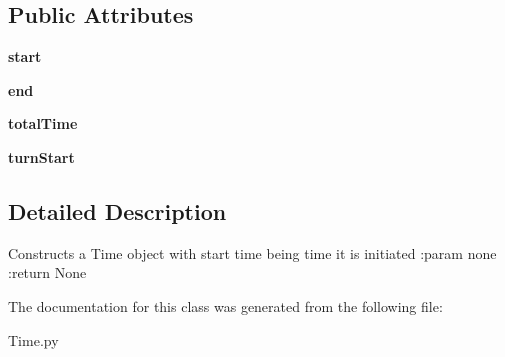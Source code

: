 \subsection*{Public Attributes}
\begin{DoxyCompactItemize}
\item 
\mbox{\label{class_time_1_1_time_a979714c0eb21ec0b20e5ba2e092b6579}} 
{\bfseries start}
\item 
\mbox{\label{class_time_1_1_time_a61b228c11c6bb3efef5ca1b432c841c0}} 
{\bfseries end}
\item 
\mbox{\label{class_time_1_1_time_afe5503bd50131699da71cb9ad56c530d}} 
{\bfseries total\+Time}
\item 
\mbox{\label{class_time_1_1_time_a2356f3a031befb638919910320e9ab8c}} 
{\bfseries turn\+Start}
\end{DoxyCompactItemize}


\subsection{Detailed Description}
\begin{DoxyVerb}Constructs a Time object with start time being time it is initiated
:param none
:return None
\end{DoxyVerb}
 

The documentation for this class was generated from the following file\+:\begin{DoxyCompactItemize}
\item 
Time.\+py\end{DoxyCompactItemize}
